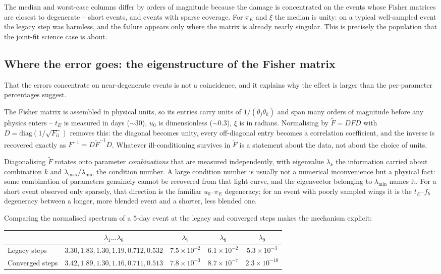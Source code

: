 The median and worst-case columns differ by orders of magnitude because the damage is
concentrated on the events whose Fisher matrices are closest to degenerate -- short events, and
events with sparse coverage. For $\pi_E$ and $\xi$ the median is unity: on a typical
well-sampled event the legacy step was harmless, and the failure appears only where the matrix is
already nearly singular. This is precisely the population that the joint-fit science case is about.

\subsection{Where the error goes: the eigenstructure of the Fisher matrix}
\label{app:stepsize_eigen}

That the errors concentrate on near-degenerate events is not a coincidence, and it explains why
the effect is larger than the per-parameter percentages suggest.

The Fisher matrix is assembled in physical units, so its entries carry units of
$1/(\theta_j\theta_k)$ and span many orders of magnitude before any physics enters --
$t_E$ is measured in days ($\sim 30$), $u_0$ is dimensionless ($\sim 0.3$), $\xi$ is in radians.
Normalising by $\tilde{F} = D F D$ with $D = \mathrm{diag}(1/\sqrt{F_{ii}})$ removes this: the
diagonal becomes unity, every off-diagonal entry becomes a correlation coefficient, and the
inverse is recovered exactly as $F^{-1} = D\tilde{F}^{-1}D$. Whatever ill-conditioning survives in
$\tilde{F}$ is a statement about the data, not about the choice of units.

Diagonalising $\tilde{F}$ rotates onto parameter \emph{combinations} that are measured
independently, with eigenvalue $\lambda_k$ the information carried about combination $k$ and
$\lambda_{\max}/\lambda_{\min}$ the condition number. A large condition number is usually not a
numerical inconvenience but a physical fact: some combination of parameters genuinely cannot be
recovered from that light curve, and the eigenvector belonging to $\lambda_{\min}$ names it.
For a short event observed only sparsely, that direction is the familiar $u_0$--$\pi_E$
degeneracy; for an event with poorly sampled wings it is the $t_E$--$f_b$ degeneracy between a
longer, more blended event and a shorter, less blended one.

Comparing the normalised spectrum of a $5$-day event at the legacy and converged steps makes the
mechanism explicit:

\begin{center}
\begin{tabular}{lcccc}
	\toprule
	& $\lambda_1 \ldots \lambda_6$ & $\lambda_7$ & $\lambda_8$ & $\lambda_9$ \\
	\midrule
	Legacy steps    & $3.30, 1.83, 1.30, 1.19, 0.712, 0.532$ & $7.5\times10^{-2}$ & $6.1\times10^{-2}$ & $5.3\times10^{-3}$ \\
	Converged steps & $3.42, 1.89, 1.30, 1.16, 0.711, 0.513$ & $7.8\times10^{-3}$ & $8.7\times10^{-7}$ & $2.3\times10^{-10}$ \\
	\bottomrule
\end{tabular}
\end{center}

